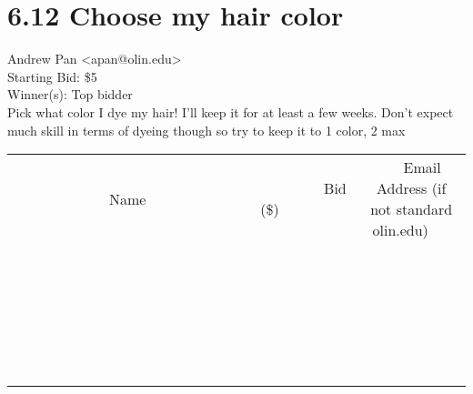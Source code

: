 \documentclass[11pt]{article}
\begin{document}
					\section*{6.12 Choose my hair color}
					Andrew Pan <apan@olin.edu> \\
					Starting Bid: \$5 \\
					Winner(s): Top bidder \\
					Pick what color I dye my hair!  I'll keep it for at least a few weeks. Don't expect much skill in terms of dyeing though so try to keep it to 1 color, 2 max \\
					[6ex]
					\begin{tabular}{c c c}
						~~~~~~~~~~~~~Name~~~~~~~~~~~~~ & ~~~~~~~~~Bid (\$)~~~~~~~~~ & ~~~Email Address (if not standard olin.edu)~~~ \\
				
 & & \\
\hline
 & & \\
\hline
 & & \\
\hline
 & & \\
\hline
 & & \\
\hline
 & & \\
\hline
 & & \\
\hline
 & & \\
\hline
 & & \\
\hline
 & & \\
\hline
 & & \\
\hline
 & & \\
\hline
 & & \\
\hline
 & & \\
\hline
 & & \\
\hline
 & & \\
\hline
 & & \\
\hline
 & & \\
\hline
 & & \\
\hline
 & & \\
\hline
 & & \\
\hline
 & & \\
\hline
 & & \\
\hline
 & & \\
\hline
 & & \\
\hline
 & & \\
\hline
					\end{tabular}
					\clearpage
				
\end{document}
